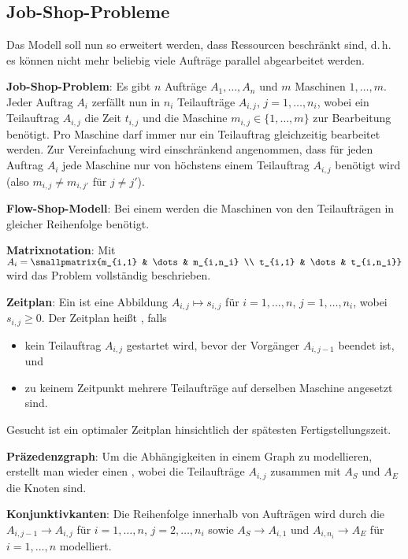 \pagebreak

\subsection{%
    Job-Shop-Probleme%
}

Das Modell soll nun so erweitert werden, dass Ressourcen beschränkt sind,
d.\,h. es können nicht mehr beliebig viele Aufträge parallel abgearbeitet werden.

\textbf{Job-Shop-Problem}:
Es gibt $n$ Aufträge $A_1, \dotsc, A_n$
und $m$ Maschinen $1, \dotsc, m$.
Jeder Auftrag $A_i$ zerfällt nun in $n_i$ Teilaufträge $A_{i,j}$, $j = 1, \dotsc, n_i$,
wobei ein Teilauftrag $A_{i,j}$ die Zeit $t_{i,j}$ und
die Maschine $m_{i,j} \in \{1, \dotsc, m\}$ zur Bearbeitung benötigt.
Pro Maschine darf immer nur ein Teilauftrag gleichzeitig bearbeitet werden.
Zur Vereinfachung wird einschränkend angenommen, dass für jeden Auftrag $A_i$
jede Maschine nur von höchstens einem Teilauftrag $A_{i,j}$ benötigt wird
(also $m_{i,j} \not= m_{i,j'}$ für $j \not= j'$).

\textbf{Flow-Shop-Modell}:
Bei einem  werden die Maschinen von den Teilaufträgen in gleicher
Reihenfolge benötigt.

\textbf{Matrixnotation}:
Mit $A_i = \smallpmatrix{m_{i,1} & \dots & m_{i,n_i} \\ t_{i,1} & \dots & t_{i,n_i}}$
wird das Problem vollständig beschrieben.

\textbf{Zeitplan}:
Ein  ist eine Abbildung $A_{i,j} \mapsto s_{i,j}$ für
$i = 1, \dotsc, n$, $j = 1, \dotsc, n_i$, wobei $s_{i,j} \ge 0$.
Der Zeitplan heißt , falls
\begin{itemize}
    \item
    kein Teilauftrag $A_{i,j}$ gestartet wird, bevor der Vorgänger $A_{i,j-1}$ beendet ist, und

    \item
    zu keinem Zeitpunkt mehrere Teilaufträge auf derselben Maschine angesetzt sind.
\end{itemize}
Gesucht ist ein optimaler Zeitplan hinsichtlich der spätesten Fertigstellungszeit.

\linie

\textbf{Präzedenzgraph}:
Um die Abhängigkeiten in einem Graph zu modellieren, erstellt man wieder einen
, wobei die Teilaufträge $A_{i,j}$ zusammen mit $A_S$ und $A_E$
die Knoten sind.

\textbf{Konjunktivkanten}:
Die Reihenfolge innerhalb von Aufträgen wird durch die 
$A_{i,j-1} \to A_{i,j}$ für $i = 1, \dotsc, n$, $j = 2, \dotsc, n_i$
sowie $A_S \to A_{i,1}$ und $A_{i,n_i} \to A_E$ für $i = 1, \dotsc, n$ modelliert.

